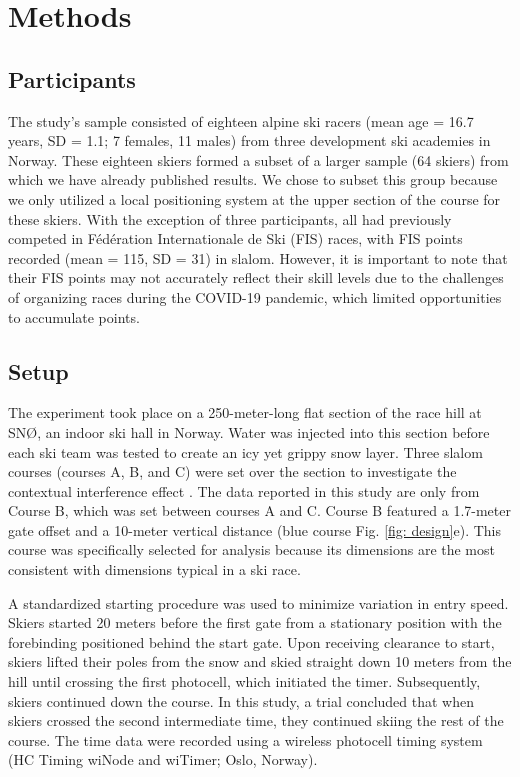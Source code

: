 \documentclass{article}
\begin{document}
 


\section{Methods}


\subsection*{Participants}
The study's sample consisted of eighteen alpine ski racers (mean age = 16.7 years, SD = 1.1; 7 females, 11 males) from three development ski academies in Norway. These eighteen skiers formed a subset of a larger sample (64 skiers) from which we have already published results. We chose to subset this group because we only utilized a local positioning system at the upper section of the course for these skiers. With the exception of three participants, all had previously competed in Fédération Internationale de Ski (FIS) races, with FIS points recorded (mean = 115, SD = 31) in slalom. However, it is important to note that their FIS points may not accurately reflect their skill levels due to the challenges of organizing races during the COVID-19 pandemic, which limited opportunities to accumulate points.

\subsection{Setup}
The experiment took place on a 250-meter-long flat section of the race hill at SNØ, an indoor ski hall in Norway. Water was injected into this section before each ski team was tested to create an icy yet grippy snow layer. Three slalom courses (courses A, B, and C) were set over the section to investigate the contextual interference effect \cite{magelssen_is_2022}. The data reported in this study are only from Course B, which was set between courses A and C. Course B featured a 1.7-meter gate offset and a 10-meter vertical distance (blue course Fig. \ref{fig: design}e). This course was specifically selected for analysis because its dimensions are the most consistent with dimensions typical in a ski race.

A standardized starting procedure was used to minimize variation in entry speed. Skiers started 20 meters before the first gate from a stationary position with the forebinding positioned behind the start gate. Upon receiving clearance to start, skiers lifted their poles from the snow and skied straight down 10 meters from the hill until crossing the first photocell, which initiated the timer. Subsequently, skiers continued down the course. In this study, a trial concluded that when skiers crossed the second intermediate time, they continued skiing the rest of the course. The time data were recorded using a wireless photocell timing system (HC Timing wiNode and wiTimer; Oslo, Norway).
\end{document}
